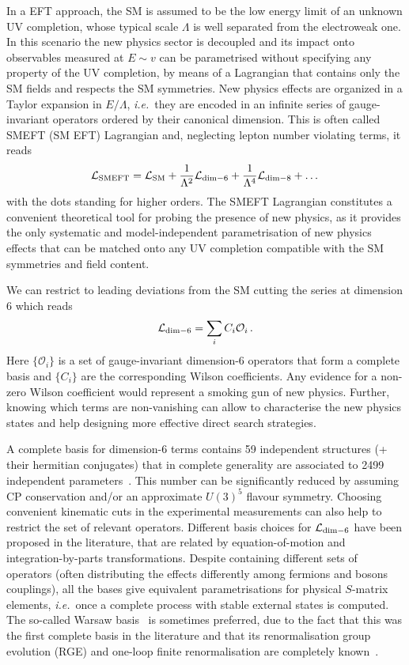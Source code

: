 In a EFT approach, the SM is assumed to be the low energy limit of an unknown UV completion, whose typical scale $\Lambda$ is well separated from the electroweak one.
In this scenario the new physics sector is decoupled and its impact onto observables measured at $E\sim v$ can be parametrised without specifying any property of the UV completion, by means of a Lagrangian that contains only the SM fields and respects the SM symmetries.
New physics effects are organized in a Taylor expansion in $E/\Lambda$, \emph{i.e.}\ they are encoded in an infinite series of gauge-invariant operators ordered by their canonical dimension.
This is often called SMEFT (SM EFT) Lagrangian and, neglecting lepton number violating terms, it reads
\begin{equation}
 \mathcal{L}_{\rm SMEFT} = \mathcal{L}_{\rm SM} + \frac{1}{\Lambda^2}\mathcal{L}_{\rm dim-6} + \frac{1}{\Lambda^4}\mathcal{L}_{\rm dim-8} + \dots
\end{equation} 
with the dots standing for higher orders.
The SMEFT Lagrangian constitutes a convenient theoretical tool for probing the presence of new physics, as it provides the only systematic and model-independent parametrisation of new physics effects that can be matched onto any UV completion compatible with the SM symmetries and field content.

We can restrict to leading deviations from the SM cutting the series at dimension 6 which reads
\begin{equation}
 \mathcal{L}_{\rm dim-6} = \sum_i C_i \mathcal{O}_i\,.
\end{equation} 
Here $\{\mathcal{O}_i\}$ is a set of gauge-invariant dimension-6 operators that form a complete basis and $\{C_i\}$ are the corresponding Wilson coefficients.
%
Any evidence for a non-zero Wilson coefficient would represent a smoking gun of new physics.
Further, knowing which terms are non-vanishing can allow to characterise the new physics states and help designing more effective direct search strategies.


A complete basis for dimension-6 terms contains 59 independent structures (+ their hermitian conjugates) that in complete generality are associated to 2499 independent parameters~\cite{Alonso:2013hga}.
This number can be significantly reduced by assuming CP conservation and/or an approximate $U(3)^5$ flavour symmetry.
Choosing convenient kinematic cuts in the experimental measurements can also help to restrict the set of relevant operators.
Different basis choices for $\mathcal{L}_{\rm dim-6}$ have been proposed in the literature, that are related by equation-of-motion and integration-by-parts transformations. 
Despite containing different sets of operators (often distributing the effects differently among fermions and bosons couplings), all the bases give equivalent parametrisations for physical $S$-matrix elements, \emph{i.e.}\ once a complete process with stable external states is computed. 
The so-called Warsaw basis~\cite{Grzadkowski:2010es} is sometimes preferred, due to the fact that this was the first complete basis in the literature and that its renormalisation group evolution (RGE) and one-loop finite renormalisation are completely known~\cite{Jenkins:2013zja,Jenkins:2013wua,Alonso:2013hga,Grojean:2013kd,Alonso:2014zka,Ghezzi:2015vva}.


